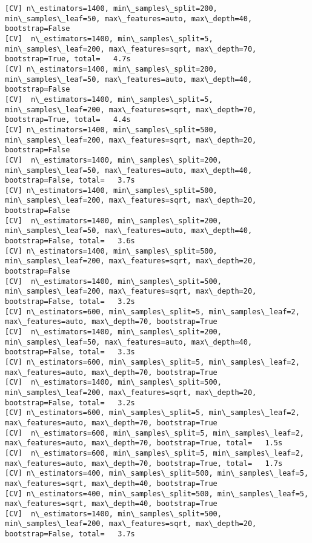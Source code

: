 \documentclass[11pt]{article}
\begin{document}
\begin{Verbatim}[commandchars=\\\{\}]
[CV] n\_estimators=1400, min\_samples\_split=200, min\_samples\_leaf=50, max\_features=auto, max\_depth=40, bootstrap=False 
[CV]  n\_estimators=1400, min\_samples\_split=5, min\_samples\_leaf=200, max\_features=sqrt, max\_depth=70, bootstrap=True, total=   4.7s
[CV] n\_estimators=1400, min\_samples\_split=200, min\_samples\_leaf=50, max\_features=auto, max\_depth=40, bootstrap=False 
[CV]  n\_estimators=1400, min\_samples\_split=5, min\_samples\_leaf=200, max\_features=sqrt, max\_depth=70, bootstrap=True, total=   4.4s
[CV] n\_estimators=1400, min\_samples\_split=500, min\_samples\_leaf=200, max\_features=sqrt, max\_depth=20, bootstrap=False 
[CV]  n\_estimators=1400, min\_samples\_split=200, min\_samples\_leaf=50, max\_features=auto, max\_depth=40, bootstrap=False, total=   3.7s
[CV] n\_estimators=1400, min\_samples\_split=500, min\_samples\_leaf=200, max\_features=sqrt, max\_depth=20, bootstrap=False 
[CV]  n\_estimators=1400, min\_samples\_split=200, min\_samples\_leaf=50, max\_features=auto, max\_depth=40, bootstrap=False, total=   3.6s
[CV] n\_estimators=1400, min\_samples\_split=500, min\_samples\_leaf=200, max\_features=sqrt, max\_depth=20, bootstrap=False 
[CV]  n\_estimators=1400, min\_samples\_split=500, min\_samples\_leaf=200, max\_features=sqrt, max\_depth=20, bootstrap=False, total=   3.2s
[CV] n\_estimators=600, min\_samples\_split=5, min\_samples\_leaf=2, max\_features=auto, max\_depth=70, bootstrap=True 
[CV]  n\_estimators=1400, min\_samples\_split=200, min\_samples\_leaf=50, max\_features=auto, max\_depth=40, bootstrap=False, total=   3.3s
[CV] n\_estimators=600, min\_samples\_split=5, min\_samples\_leaf=2, max\_features=auto, max\_depth=70, bootstrap=True 
[CV]  n\_estimators=1400, min\_samples\_split=500, min\_samples\_leaf=200, max\_features=sqrt, max\_depth=20, bootstrap=False, total=   3.2s
[CV] n\_estimators=600, min\_samples\_split=5, min\_samples\_leaf=2, max\_features=auto, max\_depth=70, bootstrap=True 
[CV]  n\_estimators=600, min\_samples\_split=5, min\_samples\_leaf=2, max\_features=auto, max\_depth=70, bootstrap=True, total=   1.5s
[CV]  n\_estimators=600, min\_samples\_split=5, min\_samples\_leaf=2, max\_features=auto, max\_depth=70, bootstrap=True, total=   1.7s
[CV] n\_estimators=400, min\_samples\_split=500, min\_samples\_leaf=5, max\_features=sqrt, max\_depth=40, bootstrap=True 
[CV] n\_estimators=400, min\_samples\_split=500, min\_samples\_leaf=5, max\_features=sqrt, max\_depth=40, bootstrap=True 
[CV]  n\_estimators=1400, min\_samples\_split=500, min\_samples\_leaf=200, max\_features=sqrt, max\_depth=20, bootstrap=False, total=   3.7s

\end{Verbatim}
\end{document}
